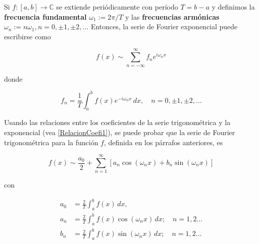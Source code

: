Si $f:[a,b] \longrightarrow \mathbb{C}$ se extiende periódicamente con período $T = b-a$ y definimos la \textbf{frecuencia fundamental} $\omega_1 := 2\pi/T$ y las \textbf{frecuencias armónicas} $\omega_n := n \omega_1, n = 0, \pm 1, \pm 2,\dots$ Entonces, la serie de Fourier exponencial puede escribirse como 
\begin{shaded}
  $$f(x) \sim \sum_{n = - \infty}^{\infty} f_n e^{i \omega_n x}$$
\end{shaded}

donde 
\begin{shaded}
$$f_n = \frac{1}{T} \int_a^b f(x) e^{-i \omega_n x} \,dx, \quad n = 0, \pm 1, \pm 2, \dots$$    
\end{shaded}

Usando las relaciones entre los coeficientes de la serie trigonométrica y la exponencial (vea \eqref{RelacionCoefi1}), se puede probar que la serie de Fourier trigonométrica para la función $f$, definida en los párrafos anteriores, es
\begin{shaded}
$$f(x) \sim \frac{a_0}{2} + \sum_{n=1}^{\infty} \left[a_n \cos(\omega_n x) + b_n \sin(\omega_n x) \right]$$    
\end{shaded}

con
\begin{shaded}
 \begin{align*}
    a_0 &= \frac{2}{T} \int_a^b f(x) \,dx , \\
    a_n &= \frac{2}{T} \int_a^b f(x) \cos(\omega_n x) \,dx; \quad n = 1,2 \dots \\
    b_n &= \frac{2}{T} \int_a^b f(x) \sin(\omega_n x) \,dx; \quad n = 1,2 \dots
\end{align*}   
\end{shaded}
